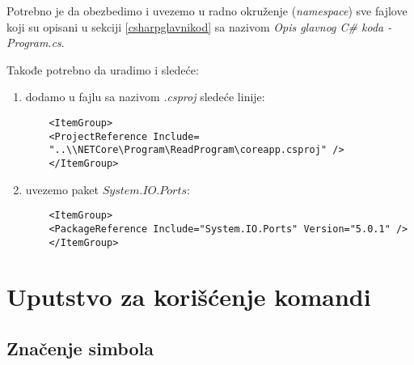 \documentclass[a4paper]{extarticle}
\begin{document}
Potrebno je da obezbedimo i uvezemo u radno okruženje (\textit{namespace}) sve fajlove koji su opisani u sekciji \ref{csharpglavnikod} sa nazivom \textit{Opis glavnog C\# koda  - Program.cs}.

Takođe potrebno da uradimo i sledeće:
\begin{enumerate}
	\item dodamo u  fajlu sa nazivom \textit{.csproj} sledeće linije:
	\begin{verbatim}
	<ItemGroup>
	<ProjectReference Include=
	"..\\NETCore\Program\ReadProgram\coreapp.csproj" />
	</ItemGroup>
	\end{verbatim}
	\item uvezemo paket $System.IO.Ports$:
	\begin{verbatim}
	<ItemGroup>
	<PackageReference Include="System.IO.Ports" Version="5.0.1" />
	</ItemGroup>
	\end{verbatim}
\end{enumerate}



\section{Uputstvo za korišćenje komandi}


\subsection{Značenje simbola}
\begin{table}[h]
	\centering
	\caption{Značenje simbola}
	\label{tab:my-table}
\end{table}
\end{document}
